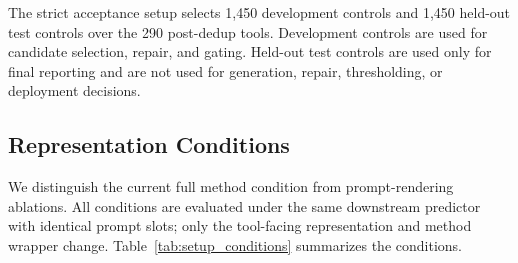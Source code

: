 \documentclass[11pt]{article}
\begin{document}
The strict acceptance setup selects 1,450 development controls and 1,450 held-out test controls over the 290 post-dedup tools. Development controls are used for candidate selection, repair, and gating. Held-out test controls are used only for final reporting and are not used for generation, repair, thresholding, or deployment decisions.

\subsection{Representation Conditions}
\label{subsec:conditions}

We distinguish the current full method condition from prompt-rendering ablations. All conditions are evaluated under the same downstream predictor with identical prompt slots; only the tool-facing representation and method wrapper change. Table~\ref{tab:setup_conditions} summarizes the conditions.
\end{document}

